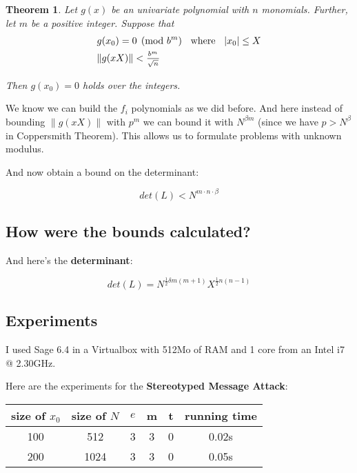 \documentclass[a4paper,11pt]{article}
\newtheorem{theorem}{Theorem}
\begin{document}
\begin{theorem}
Let $g(x)$ be an univariate polynomial with $n$ monomials. Further, let $m$ be a positive integer. Suppose that
\setcounter{equation}{0}
\begin{align}
&g(x_0) = 0 \pmod{b^m} \hspace{2mm} \text{ where } \hspace{2mm} |x_0| \leq X\\
&\|g(xX)\| < \frac{_{b^m}}{^{\sqrt{n}}}
\end{align}

Then $g(x_0)=0$ holds over the integers.
\end{theorem}

We know we can build the $f_i$ polynomials as we did before. And here instead of bounding $\|g(xX)\|$ with $p^m$ we can bound it with $N^{\beta m}$ (since we have $p > N^\beta$ in Coppersmith Theorem). This allows us to formulate problems with unknown modulus.

And now obtain a bound on the determinant:

\[ det(L) < N^{m \cdot n \cdot \beta} \]

\subsection{How were the bounds calculated?}\label{bounds}

And here's the \textbf{determinant}:

\[ det(L) = N^{\frac{1}{2}\delta m (m+1)}X^{\frac{1}{2}n(n-1)} \]

\subsection{Experiments}\label{coppersmith-experiments}

I used Sage 6.4 in a Virtualbox with 512Mo of RAM and 1 core from an Intel i7 @ 2.30GHz.

Here are the experiments for the \textbf{Stereotyped Message Attack}:

\begin{center} 
\begin{tabular}{@{} *6c @{}}
\toprule
 size of $x_0$ & size of $N$ & $e$ & m & t & running time \\ 
\midrule
 100 & 512 & 3 & 3 & 0 & 0.02s\\ 
 200 & 1024 & 3 & 3 & 0 & 0.05s\\
\bottomrule
\end{tabular}
\end{center} 
\end{document}
